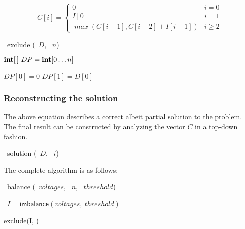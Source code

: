 \[
    C[i] = \begin{cases}
        0                                      & i=0      \\
        I[0]                                   & i=1      \\
        \mathit{\max}(C[i-1], C[i-2] + I[i-1]) & i \geq 2
    \end{cases}
\]
\begin{algorithm}
    \DontPrintSemicolon
    \NoCaptionOfAlgo
    \caption[exclude]{\INTEGER\ \textsf{exclude} (\INTARRAY\ $D$, \INTEGER\ $n$)}\label{algorithm:exclude}
    $\INTARRAY\ DP = \INTEGER[0 \ldots n]$\;

    $DP[0] = 0$\;
    $DP[1] = D[0]$\;


    \;
\end{algorithm}

\subsubsection{Reconstructing the solution}
The above equation describes a correct albeit partial solution to the problem. The final result can be constructed by analyzing the vector $C$ in a top-down fashion.

\begin{algorithm}[H]
    \DontPrintSemicolon
    \NoCaptionOfAlgo
    \caption[solution]{\SET\ \textsf{solution} (\INTARRAY\ $D$, \INTEGER\ $i$)}\label{algorithm:solution}
\end{algorithm}

The complete algorithm is as follows:

\begin{algorithm}
    \DontPrintSemicolon
    \NoCaptionOfAlgo
    \caption[balancing]{\SET\ \textsf{balance} (\INTARRAY\ $voltages$, \INTEGER\ $n$, \INTEGER\ $threshold$)}\label{algorithm:balancing}

    \INTARRAY\ $I = \textsf{imbalance}(voltages,\ threshold)$\;


    \textsf{exclude}(I, )

\end{algorithm}
